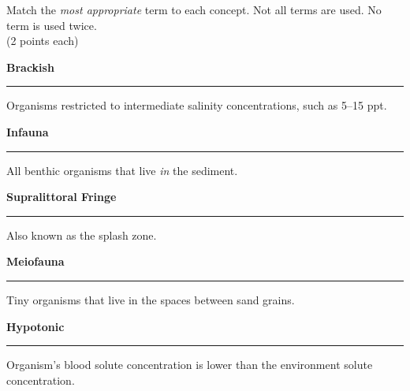\documentclass[11pt, addpoints]{exam}
\newcommand*\Matching[1]{
\ifprintanswers
	\textbf{#1}
\else
	\rule{2.1in}{0.5pt}
\fi
}
\newlength\matchlena
\newlength\matchlenb
\newcommand\MatchQuestion[2]{%
	\setlength\matchlenb{\linewidth}
	\addtolength\matchlenb{-\matchlena}
	\parbox[t]{\matchlena}{\Matching{#1}}\enspace\parbox[t]{\matchlenb}{#2}}
\newcommand{\bumppoints}[1]{%
	\addtocounter{numpoints}{#1}
}
\begin{document}
\noindent Match the \emph{most appropriate} term to each concept. Not all terms are used. No term is used twice.\\(2 points each)

\begin{questions}

\vspace{-1\baselineskip}
\fullwidth{%

}

\bumppoints{12}

\question\MatchQuestion{Brackish}{Organisms restricted to intermediate salinity concentrations, such as 5--15 ppt.}

\vspace{0.7\baselineskip}

%

%

\question\MatchQuestion{Infauna}{All benthic organisms that live \emph{in} the sediment.}

\vspace{0.7\baselineskip}

\question\MatchQuestion{Supralittoral Fringe}{Also known as the splash zone.}

\vspace{0.7\baselineskip}

\question\MatchQuestion{Meiofauna}{Tiny organisms that live in the spaces between sand grains.}

\vspace{0.7\baselineskip}



\question\MatchQuestion{Hypotonic}{Organism's blood solute concentration is lower than the environment solute concentration.}

\vspace{1\baselineskip}



\end{questions}
\end{document}
